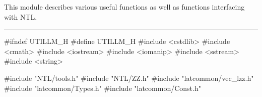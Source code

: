 % 
% 
% 
% 


This module describes various useful functions as well as
functions interfacing with NTL.

\bigskip\hrule
\code\hide
#ifndef UTILLM_H
#define UTILLM_H
\endhide
#include <cstdlib>
#include <cmath>
#include <iostream>
#include <iomanip>
#include <sstream>
#include <string>

#include "NTL/tools.h"
#include "NTL/ZZ.h"
#include "latcommon/vec_lzz.h"
#include "latcommon/Types.h"
#include "latcommon/Const.h"



